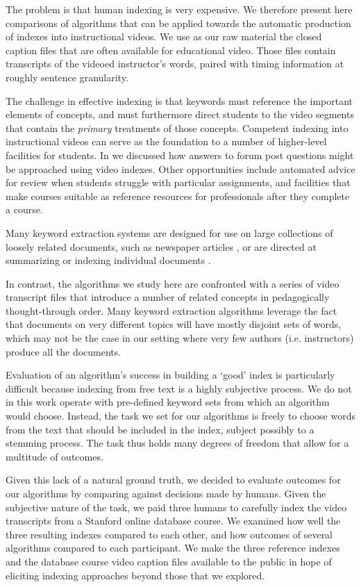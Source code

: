 The problem is that human indexing is very expensive. We therefore
present here comparisons of algorithms that can be applied towards the
automatic production of indexes into instructional videos. We use as
our raw material the closed caption files that are often available for
educational video. Those files contain transcripts of the videoed
instructor's words, paired with timing information at roughly sentence
granularity.

The challenge in effective indexing is that keywords must reference
the important elements of concepts, and must furthermore direct
students to the video segments that contain the {\em primary}
treatments of those concepts. Competent indexing into instructional
videos can serve as the foundation to a number of higher-level
facilities for students. In \cite{agrawal2015} we discussed how
answers to forum post questions might be approached using video
indexes. Other opportunities include automated advice for review when
students struggle with particular assignments, and facilities that
make courses suitable as reference resources for professionals after
they complete a course.

Many keyword extraction systems are designed for use on large
collections of loosely related documents, such as newspaper articles
\cite{Salton1975}, or are directed at summarizing or indexing
individual documents \cite{ohsawa1998}.

In contrast, the algorithms we study here are confronted with a series
of video transcript files that introduce a number of related concepts
in pedagogically thought-through order. Many keyword extraction
algorithms leverage the fact that documents on very different topics
will have mostly disjoint sets of words, which may not be the case in
our setting where very few authors (i.e. instructors) produce all the
documents.

Evaluation of an algorithm's success in building a `good' index is
particularly difficult because indexing from free text is a highly
subjective process. We do not in this work operate with pre-defined
keyword sets from which an algorithm would choose. Instead, the task we
set for our algorithms is freely to choose words from the text that
should be included in the index, subject possibly to a stemming
process. The task thus holds many degrees of freedom that allow for a
multitude of outcomes.

Given this lack of a natural ground truth, we decided to evaluate
outcomes for our algorithms by comparing against decisions made by
humans. Given the subjective nature of the task, we paid three humans
to carefully index the video transcripts from a Stanford online
database course.  We examined how well the three resulting indexes
compared to each other, and how outcomes of several algorithms
compared to each participant. We make the three reference indexes and
the database course video caption files available to the public in
hope of eliciting indexing approaches beyond those that we explored.

